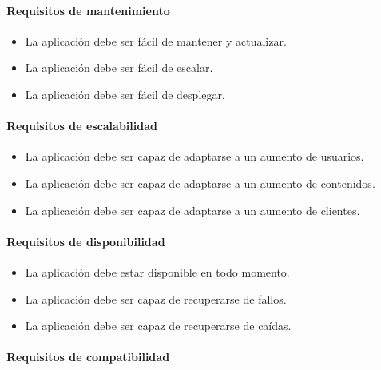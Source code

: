 \paragraph{Requisitos de mantenimiento}
\label{par:analisis_requisitos_no_funcionales_mantenimiento}

\begin{itemize}
    \item La aplicación debe ser fácil de mantener y actualizar.
    \item La aplicación debe ser fácil de escalar.
    \item La aplicación debe ser fácil de desplegar.
\end{itemize}

\paragraph{Requisitos de escalabilidad}
\label{par:analisis_requisitos_no_funcionales_escalabilidad}

\begin{itemize}
    \item La aplicación debe ser capaz de adaptarse a un aumento de usuarios.
    \item La aplicación debe ser capaz de adaptarse a un aumento de contenidos.
    \item La aplicación debe ser capaz de adaptarse a un aumento de clientes.
\end{itemize}

\paragraph{Requisitos de disponibilidad}
\label{par:analisis_requisitos_no_funcionales_disponibilidad}

\begin{itemize}
    \item La aplicación debe estar disponible en todo momento.
    \item La aplicación debe ser capaz de recuperarse de fallos.
    \item La aplicación debe ser capaz de recuperarse de caídas.
\end{itemize}

\paragraph{Requisitos de compatibilidad}
\label{par:analisis_requisitos_no_funcionales_compatibilidad}

